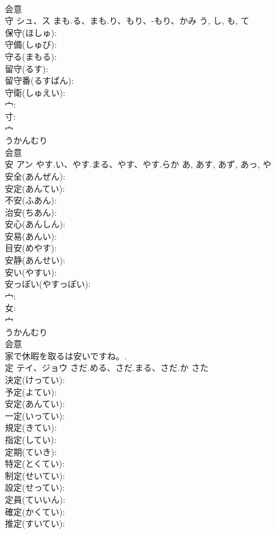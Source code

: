 \documentclass[8pt]{extreport}
\begin{document}
\begin{CJK}{UTF8}{min}
\\	会意 
\\	守	シュ、ス	まも.る、まも.り、もり、-もり、かみ	う, し, も, て	
\\	保守(ほしゅ): 
\\	守備(しゅび): 
\\	守る(まもる): 
\\	留守(るす): 
\\	留守番(るすばん): 
\\	守衛(しゅえい): 
\\	宀: 
\\	寸: 
\\	宀	
\\	うかんむり	
\\	会意 
\\	安	アン	やす.い、やす.まる、やす、やす.らか	あ, あす, あず, あっ, や	
\\	安全(あんぜん): 
\\	安定(あんてい): 
\\	不安(ふあん): 
\\	治安(ちあん): 
\\	安心(あんしん): 
\\	安易(あんい): 
\\	目安(めやす): 
\\	安静(あんせい): 
\\	安い(やすい): 
\\	安っぽい(やすっぽい): 
\\	宀: 
\\	女: 
\\	宀	
\\	うかんむり	
\\	会意 
\\	家で休暇を取るは安いですね。.	
\\	定	テイ、ジョウ	さだ.める、さだ.まる、さだ.か	さた	
\\	決定(けってい): 
\\	予定(よてい): 
\\	安定(あんてい): 
\\	一定(いってい): 
\\	規定(きてい): 
\\	指定(してい): 
\\	定期(ていき): 
\\	特定(とくてい): 
\\	制定(せいてい): 
\\	設定(せってい): 
\\	定員(ていいん): 
\\	確定(かくてい): 
\\	推定(すいてい): 

\end{CJK}
\end{document}
